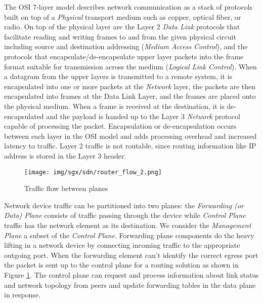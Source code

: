 

The OSI 7-layer model\cite{Zimmermann_1980} describes network communication as a stack of protocols built on top of a \textit{Physical} transport medium such as copper, optical fiber, or radio. On top of the physical layer are the Layer 2 \textit{Data Link} protocols that facilitate reading and writing frames to and from the given physical circuit including source and destination addressing (\textit{Medium Access Control}), and the protocols that encapsulate/de-encapsulate upper layer packets into the frame format suitable for transmission across the medium (\textit{Logical Link Control}). When a datagram from the upper layers is transmitted to a remote system, it is encapsulated into one or more packets at the \textit{Network} layer, the packets are then encapsulated into frames at the Data Link Layer, and the frames are placed onto the physical medium.  When a frame is received at the destination, it is de-encapsulated and the payload is handed up to the Layer 3 \textit{Network} protocol capable of processing the packet. Encapsulation or de-encapsulation occurs between each layer in the OSI model and  adds processing overhead and increased latency to traffic. Layer 2 traffic is not routable, since routing information like IP address is stored in the Layer 3 header. 

\begin{figure}[H]
\centering
\texttt{[image: img/sgx/sdn/router\_flow\_2.png]}
\caption{Traffic flow between planes}
\label{fig:router_flow}
\end{figure} 

Network device traffic can be partitioned into two planes\cite{Khosravi_Anderson_2003}: the \textit{Forwarding (or Data) Plane} consists of traffic passing through the device while \textit{Control Plane} traffic has the network element as its destination. We consider the \textit{Management Plane} a subset of the \textit{Control Plane}. Forwarding plane components do the heavy lifting in a network device by connecting incoming traffic to the appropriate outgoing port. When the forwarding element can't identify the correct egress port the packet is sent up to the control plane for a routing solution as shown in Figure \ref{fig:router_flow}. The control plane can request and process information about link status and network topology from peers and update forwarding tables in the data plane in response. 

